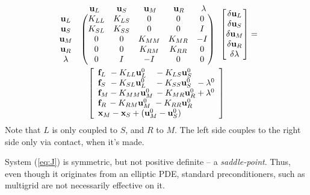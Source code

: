 \documentclass[11pt]{article}
\newcommand{\vecx}{{\bf x}}
\newcommand{\vecu}{{\bf u}}
\newcommand{\vecf}{{\bf f}}
\begin{document}
\begin{multline}
\label{eq:J}
\begin{array}{lc}  &  \begin{array}{ccccc} \vecu_L \quad & \vecu_S \quad & \vecu_M \quad & \vecu_R & \quad \lambda \end{array}\\
\begin{matrix} \vecu_L\\ \vecu_S \\ \vecu_M \\ \vecu_R \\ \lambda\end{matrix} &
\begin{pmatrix}
 K_{LL} & K_{LS} &   0   &  0 & 0\\
 K_{SL} & K_{SS} &   0   &  0 & I\\
 0     &   0    & K_{MM}& K_{MR} & -I\\
 0     &   0    & K_{RM}& K_{RR} &  0\\
 0     &   I    &    -I & 0 & 0
\end{pmatrix}
\end{array}
\begin{bmatrix}
\delta \vecu_L\\ \delta \vecu_S \\ \delta \vecu_M \\ \delta \vecu_R \\ \delta \lambda
\end{bmatrix}
=\\
\left[\begin{array}{l}
\vecf_L \ - K_{LL} \vecu_L^0 \ \ \ - K_{LS} \vecu_S^0 \\
\vecf_S \ - K_{SL} \vecu_L^0 \ \ \ - K_{SS} \vecu_S^0 \ \,- \lambda^0\\
\vecf_M - K_{MM} \vecu_M^0 \, - K_{MR} \vecu_R^0  + \lambda^0\\
\vecf_R \, - K_{RM} \vecu_M^0 \ - K_{RR} \vecu_R^0 \\
\vecx_M - \vecx_S + (\vecu_M^0 - \vecu_S^0)
\end{array}\right]
\end{multline}
Note that $L$ is only coupled to $S$, and $R$ to $M$.
The left side couples to the right side only via contact, when it's made.


System (\ref{eq:J}) is symmetric, but not positive definite -- a \emph{saddle-point}.
Thus, even though it originates from an elliptic PDE, standard preconditioners, such as multigrid are not necessarily effective on it.
\end{document}
